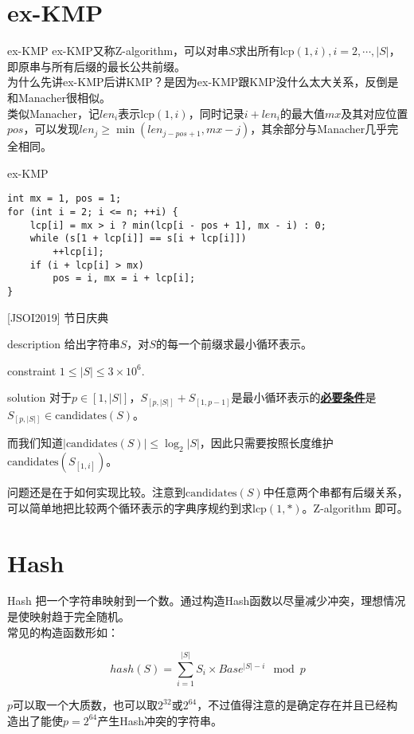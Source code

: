 \documentclass{beamer}
\theoremstyle{compact}
\def\obj#1{\textbf{\uline{#1}}}
\def\le{\leqslant}
\def\ge{\geqslant}
\def\lcp{\textrm{lcp}}
\begin{document}
\section{ex-KMP}
\begin{frame}{ex-KMP}
	ex-KMP又称Z-algorithm，可以对串$S$求出所有$\lcp(1,i), i = 2, \cdots, |S|$，即原串与所有后缀的最长公共前缀。
	\\
	
	为什么先讲ex-KMP后讲KMP？是因为ex-KMP跟KMP没什么太大关系，反倒是和Manacher很相似。
	\\
	
	类似Manacher，记$len_i$表示$\lcp(1,i)$，同时记录$i+len_i$的最大值$mx$及其对应位置$pos$，可以发现$len_j \ge \min(len_{j-pos+1},mx-j)$，其余部分与Manacher几乎完全相同。
\end{frame}
\begin{frame}[fragile]{ex-KMP}
	\begin{verbatim}
int mx = 1, pos = 1;
for (int i = 2; i <= n; ++i) {
    lcp[i] = mx > i ? min(lcp[i - pos + 1], mx - i) : 0;
    while (s[1 + lcp[i]] == s[i + lcp[i]])
        ++lcp[i];
    if (i + lcp[i] > mx)
        pos = i, mx = i + lcp[i];
}
	\end{verbatim}
\end{frame}
\begin{frame}{[JSOI2019] 节日庆典}
	\begin{block}{description}
		给出字符串$S$，对$S$的每一个前缀求最小循环表示。
	\end{block}
	\begin{block}{constraint}
		$1 \le |S| \le 3 \times 10^6.$
	\end{block}
	\pause
	\begin{block}{solution}
		对于$p \in [1, |S|]$，$S_{[p, |S|]} + S_{[1, p - 1]}$是最小循环表示的\obj{必要条件}是$S_{[p, |S|]} \in \textrm{candidates}(S)$。

		而我们知道$|\textrm{candidates}(S)| \le \log_2|S|$，因此只需要按照长度维护$\textrm{candidates}(S_{[1, i]})$。

		问题还是在于如何实现比较。注意到$\textrm{candidates}(S)$中任意两个串都有后缀关系，可以简单地把比较两个循环表示的字典序规约到求$\lcp(1, *)$。Z-algorithm 即可。
	\end{block}
\end{frame}


\section{Hash}
\begin{frame}{Hash}
	把一个字符串映射到一个数。通过构造Hash函数以尽量减少冲突，理想情况是使映射趋于完全随机。\\
	
	常见的构造函数形如：
	
	$$hash(S)=\sum_{i=1}^{|S|}S_i\times Base^{|S|-i} \mod p$$
	
	$p$可以取一个大质数，也可以取$2^{32}$或$2^{64}$，不过值得注意的是确定存在并且已经构造出了能使$p=2^{64}$产生Hash冲突的字符串。
\end{frame}
\end{document}
